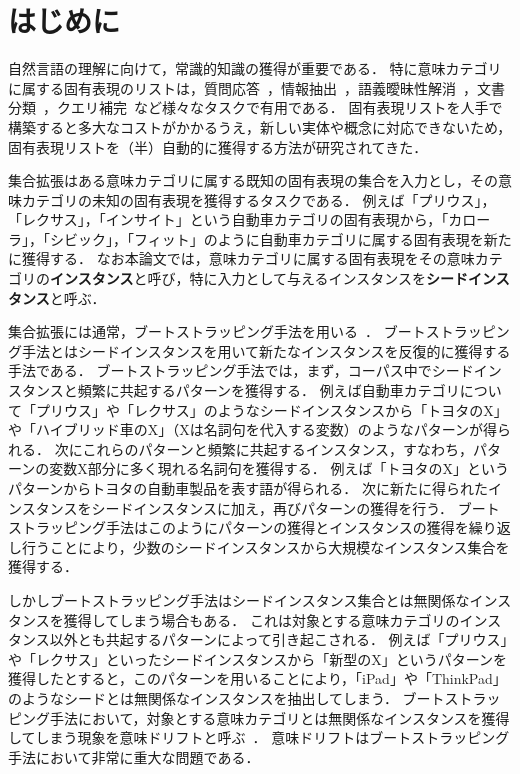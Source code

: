 \documentclass[japanese]{jnlp_1.4}
\begin{document}
\maketitle


\section{はじめに}
\label{introduction}

自然言語の理解に向けて，常識的知識の獲得が重要である．
特に意味カテゴリに属する固有表現のリストは，質問応答~\cite{Wang:2009:ASI:1687878.1687941}，情報抽出~\cite{Mintz:2009:DSR:1690219.1690287}，語義曖昧性解消~\cite{Pantel:2002:DWS:775047.775138}，文書分類~\cite{Pantel:2009:WDS:1699571.1699635}，クエリ補完~\cite{Cao:2008:CQS:1401890.1401995}など様々なタスクで有用である．
固有表現リストを人手で構築すると多大なコストがかかるうえ，新しい実体や概念に対応できないため，固有表現リストを（半）自動的に獲得する方法が研究されてきた．

集合拡張はある意味カテゴリに属する既知の固有表現の集合を入力とし，その意味カテゴリの未知の固有表現を獲得するタスクである．
例えば「プリウス」，「レクサス」，「インサイト」という自動車カテゴリの固有表現から，「カローラ」，「シビック」，「フィット」のように自動車カテゴリに属する固有表現を新たに獲得する．
なお本論文では，意味カテゴリに属する固有表現をその意味カテゴリの\textbf{インスタンス}と呼び，特に入力として与えるインスタンスを\textbf{シードインスタンス}と呼ぶ．


集合拡張には通常，ブートストラッピング手法を用いる~\cite{Hearst:1992:AAH:992133.992154,Yarowsky95unsupervisedword,Abney:2004:UYA:1105596.1105600,pantel04,pantel-pennacchiotti:2006:COLACL}．
ブートストラッピング手法とはシードインスタンスを用いて新たなインスタンスを反復的に獲得する手法である．
ブートストラッピング手法では，まず，コーパス中でシードインスタンスと頻繁に共起するパターンを獲得する．
例えば自動車カテゴリについて「プリウス」や「レクサス」のようなシードインスタンスから「トヨタのX」や「ハイブリッド車のX」（Xは名詞句を代入する変数）のようなパターンが得られる．
次にこれらのパターンと頻繁に共起するインスタンス，すなわち，パターンの変数X部分に多く現れる名詞句を獲得する．
例えば「トヨタのX」というパターンからトヨタの自動車製品を表す語が得られる．
次に新たに得られたインスタンスをシードインスタンスに加え，再びパターンの獲得を行う．
ブートストラッピング手法はこのようにパターンの獲得とインスタンスの獲得を繰り返し行うことにより，少数のシードインスタンスから大規模なインスタンス集合を獲得する．

しかしブートストラッピング手法はシードインスタンス集合とは無関係なインスタンスを獲得してしまう場合もある．
これは対象とする意味カテゴリのインスタンス以外とも共起するパターンによって引き起こされる．
例えば「プリウス」や「レクサス」といったシードインスタンスから「新型のX」というパターンを獲得したとすると，このパターンを用いることにより，「iPad」や「ThinkPad」のようなシードとは無関係なインスタンスを抽出してしまう．
ブートストラッピング手法において，対象とする意味カテゴリとは無関係なインスタンスを獲得してしまう現象を意味ドリフトと呼ぶ~\cite{Curran_minimisingsemantic}．
意味ドリフトはブートストラッピング手法において非常に重大な問題である．
\end{document}
